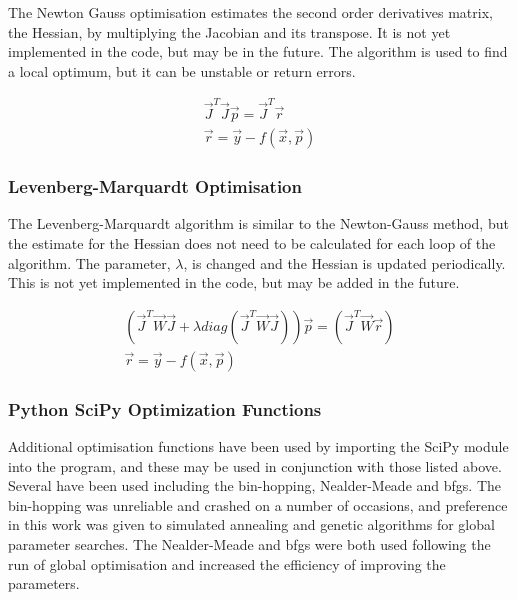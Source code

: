 The Newton Gauss optimisation estimates the second order derivatives matrix, the Hessian, by multiplying the Jacobian and its transpose.  It is not yet implemented in the code, but may be in the future.  The algorithm is used to find a local optimum, but it can be unstable or return errors.

\begin{equation}
\begin{split}
\vec{J}^{T} \vec{J} \vec{p} = \vec{J}^{T} \vec{r} \\
\vec{r} = \vec{y} - f(\vec{x}, \vec{p})
\end{split}
\label{eq:eqNewtonGauss}
\end{equation}

\subsubsection{Levenberg-Marquardt Optimisation}

The Levenberg-Marquardt algorithm is similar to the Newton-Gauss method, but the estimate for the Hessian does not need to be calculated for each loop of the algorithm.  The parameter, $\lambda$, is changed and the Hessian is updated periodically.  This is not yet implemented in the code, but may be added in the future.

\begin{equation}
\begin{split}
\left( \vec{J}^{T} \vec{W} \vec{J} + \lambda diag\left( \vec{J}^{T} \vec{W} \vec{J} \right) \right) \vec{p} = {\left(\vec{J}^{T} \vec{W} \vec{r} \right)} \\
\vec{r} = \vec{y} - f(\vec{x}, \vec{p})
\end{split}
\label{eq:eqLevenbergMarquardt}
\end{equation}


\subsubsection{Python SciPy Optimization Functions}

Additional optimisation functions have been used by importing the SciPy module into the program, and these may be used in conjunction with those listed above.  Several have been used including the bin-hopping, Nealder-Meade and \acrshort{bfgs}.  The bin-hopping was unreliable and crashed on a number of occasions, and preference in this work was given to simulated annealing and genetic algorithms for global parameter searches.  The Nealder-Meade and \acrshort{bfgs} were both used following the run of global optimisation and increased the efficiency of improving the parameters.






